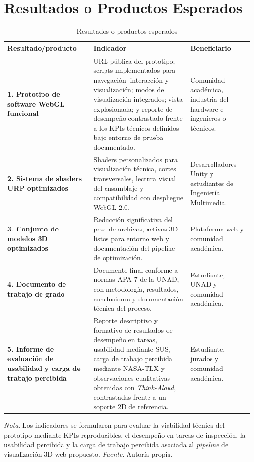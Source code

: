 \section{Resultados o Productos Esperados}

\begin{table}[H]
\caption{Resultados o productos esperados}
\centering
\footnotesize
\setlength{\tabcolsep}{4pt}
\begin{tabularx}{\textwidth}{>{\RaggedRight\arraybackslash}p{3.8cm}>{\RaggedRight\arraybackslash}X>{\RaggedRight\arraybackslash}p{3.2cm}}
\hline
\textbf{Resultado/producto} & \textbf{Indicador} & \textbf{Beneficiario} \\ \hline
\textbf{1. Prototipo de software WebGL funcional} &
URL p\'ublica del prototipo; scripts implementados para navegaci\'on, interacci\'on y visualizaci\'on; modos de visualizaci\'on integrados; vista explosionada; y reporte de desempe\~no contrastado frente a los KPIs t\'ecnicos definidos bajo entorno de prueba documentado. &
Comunidad acad\'emica, industria del hardware e ingenieros o t\'ecnicos. \\

\textbf{2. Sistema de shaders URP optimizados} &
Shaders personalizados para visualizaci\'on t\'ecnica, cortes transversales, lectura visual del ensamblaje y compatibilidad con despliegue WebGL 2.0. &
Desarrolladores Unity y estudiantes de Ingenier\'ia Multimedia. \\

\textbf{3. Conjunto de modelos 3D optimizados} &
Reducci\'on significativa del peso de archivos, activos 3D listos para entorno web y documentaci\'on del pipeline de optimizaci\'on. &
Plataforma web y comunidad acad\'emica. \\

\textbf{4. Documento de trabajo de grado} &
Documento final conforme a normas APA 7 de la UNAD, con metodolog\'ia, resultados, conclusiones y documentaci\'on t\'ecnica del proceso. &
Estudiante, UNAD y comunidad acad\'emica. \\

\textbf{5. Informe de evaluaci\'on de usabilidad y carga de trabajo percibida} &
Reporte descriptivo y formativo de resultados de desempe\~no en tareas, usabilidad mediante SUS, carga de trabajo percibida mediante NASA-TLX y observaciones cualitativas obtenidas con \textit{Think-Aloud}, contrastadas frente a un soporte 2D de referencia. &
Estudiante, jurados y comunidad acad\'emica. \\ \hline
\end{tabularx}
\normalsize
\setlength{\tabcolsep}{6pt}
\end{table}

\par\vspace{0.5\baselineskip}
\textit{Nota}. Los indicadores se formularon para evaluar la viabilidad t\'ecnica del prototipo mediante KPIs reproducibles, el desempe\~no en tareas de inspecci\'on, la usabilidad percibida y la carga de trabajo percibida asociada al \textit{pipeline} de visualizaci\'on 3D web propuesto. \textit{Fuente}. Autor\'ia propia.

\newpage
